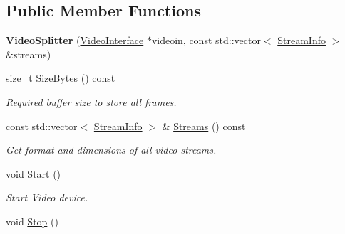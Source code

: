 \subsection*{Public Member Functions}
\begin{DoxyCompactItemize}
\item 
{\bfseries Video\+Splitter} (\hyperlink{structpangolin_1_1_video_interface}{Video\+Interface} $\ast$videoin, const std\+::vector$<$ \hyperlink{classpangolin_1_1_stream_info}{Stream\+Info} $>$ \&streams)\hypertarget{classpangolin_1_1_video_splitter_a7add43bc2f5d72f756f030465fdb2392}{}\label{classpangolin_1_1_video_splitter_a7add43bc2f5d72f756f030465fdb2392}

\item 
size\+\_\+t \hyperlink{classpangolin_1_1_video_splitter_a3f18102a14178e0bc626c2efc76eaf95}{Size\+Bytes} () const \hypertarget{classpangolin_1_1_video_splitter_a3f18102a14178e0bc626c2efc76eaf95}{}\label{classpangolin_1_1_video_splitter_a3f18102a14178e0bc626c2efc76eaf95}

\begin{DoxyCompactList}\small\item\em Required buffer size to store all frames. \end{DoxyCompactList}\item 
const std\+::vector$<$ \hyperlink{classpangolin_1_1_stream_info}{Stream\+Info} $>$ \& \hyperlink{classpangolin_1_1_video_splitter_ab324de088b519ab1fc783a16ca2f560c}{Streams} () const \hypertarget{classpangolin_1_1_video_splitter_ab324de088b519ab1fc783a16ca2f560c}{}\label{classpangolin_1_1_video_splitter_ab324de088b519ab1fc783a16ca2f560c}

\begin{DoxyCompactList}\small\item\em Get format and dimensions of all video streams. \end{DoxyCompactList}\item 
void \hyperlink{classpangolin_1_1_video_splitter_acebb7784386bd00e9f403f92cab3a2b1}{Start} ()\hypertarget{classpangolin_1_1_video_splitter_acebb7784386bd00e9f403f92cab3a2b1}{}\label{classpangolin_1_1_video_splitter_acebb7784386bd00e9f403f92cab3a2b1}

\begin{DoxyCompactList}\small\item\em Start Video device. \end{DoxyCompactList}\item 
void \hyperlink{classpangolin_1_1_video_splitter_a34fd98e2c8831669f36f1224ce6491c5}{Stop} ()\hypertarget{classpangolin_1_1_video_splitter_a34fd98e2c8831669f36f1224ce6491c5}{}\label{classpangolin_1_1_video_splitter_a34fd98e2c8831669f36f1224ce6491c5}


\end{DoxyCompactItemize}
